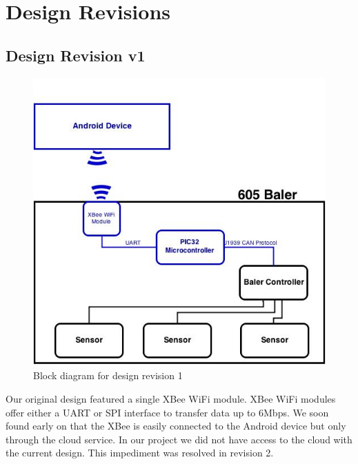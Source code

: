 \documentclass[paper=a4, fontsize=11pt]{scrartcl}
\numberwithin{equation}{section}		%
\numberwithin{figure}{section}			%
\numberwithin{table}{section}				%
\begin{document}
\pagebreak
\section{Design Revisions}
\subsection{Design Revision v1} 
 \begin{figure}[H]
	 \center\includegraphics[scale=0.4]{rev1.jpg}
 \caption{Block diagram for design revision 1}
 \end{figure}
Our original design featured a single XBee WiFi module. XBee WiFi modules offer either a UART or SPI interface to transfer data up to 6Mbps. We soon found early on that the XBee is easily connected to the Android device but only through the cloud service. In our project we did not have access to the cloud with the current design. This impediment was resolved in revision 2.\\
\end{document}
